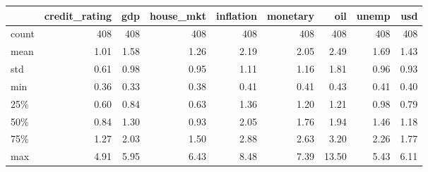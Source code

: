 \begin{tabular}{lrrrrrrrr}
  \toprule
  {} &  credit\_rating &   gdp &  house\_mkt &  inflation &  monetary &   oil &  unemp &   usd \\
  \midrule
  count &           408 & 408 &     408 &     408 &    408 & 408 & 408 & 408 \\
  mean  &             1.01 &   1.58 &       1.26 &       2.19 &      2.05 &   2.49 &   1.69 &   1.43 \\
  std   &             0.61 &   0.98 &       0.95 &       1.11 &      1.16 &   1.81 &   0.96 &   0.93 \\
  min   &             0.36 &   0.33 &       0.38 &       0.41 &      0.41 &   0.43 &   0.41 &   0.40 \\
  25\%   &             0.60 &   0.84 &       0.63 &       1.36 &      1.20 &   1.21 &   0.98 &   0.79 \\
  50\%   &             0.84 &   1.30 &       0.93 &       2.05 &      1.76 &   1.94 &   1.46 &   1.18 \\
  75\%   &             1.27 &   2.03 &       1.50 &       2.88 &      2.63 &   3.20 &   2.26 &   1.77 \\
  max   &             4.91 &   5.95 &       6.43 &       8.48 &      7.39 &  13.50 &   5.43 &   6.11 \\
  \bottomrule
  \end{tabular}